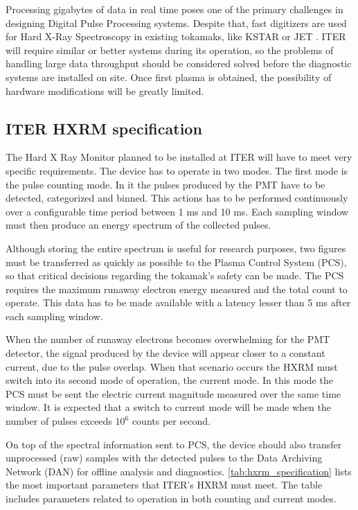 Processing gigabytes of data in real time poses one of 
the primary challenges in designing Digital Pulse Processing systems.
Despite that, fast digitizers are used for Hard X-Ray Spectroscopy
in existing tokamaks, like KSTAR or JET \cite{hxrm_jet, kstar_upgrade}.
ITER will require similar or better systems during its operation,
so the problems of handling large data throughput
should be considered solved before the diagnostic systems
are installed on site. Once first plasma is obtained,
the possibility of hardware modifications will be greatly limited.
 

\subsection{ITER HXRM specification}

The Hard X Ray Monitor planned to be installed at ITER will 
have to meet very specific requirements. The device 
has to operate in two modes. The first mode is the pulse 
counting mode. In it the pulses produced by the PMT have to be
detected, categorized and binned. This actions has to be 
performed continuously over a configurable time period between
1 ms and 10 ms. Each sampling window must then produce an 
energy spectrum of the collected pulses. 
\cite{iter_hxrm_ddd}


Although storing the entire spectrum
is useful for research purposes, two figures must be transferred 
as quickly as possible to the Plasma Control System (PCS), so that
critical decisions regarding the tokamak's safety can be made.
The PCS requires the maximum runaway electron energy measured
and the total count to operate. This data has to be made available
with a latency lesser than 5 ms after each sampling window.
\cite{iter_hxrm_ddd}


When the number of runaway electrons becomes overwhelming for
the PMT detector, the signal produced by the device will 
appear closer to a constant current, due to the pulse overlap.
When that scenario occurs the HXRM must switch into its second 
mode of operation, the current mode. In this mode the PCS 
must be sent the electric current magnitude measured over the 
same time window. It is expected that a switch to current mode
will be made when the number of pulses exceeds $10^6$ counts per second.


On top of the spectral information sent to PCS,
the device should also transfer unprocessed (raw) samples with the detected pulses
to the Data Archiving Network (DAN) for offline analysis and diagnostics.
\autoref{tab:hxrm_specification} lists the most important 
parameters that ITER's HXRM must meet. 
The table includes parameters related to operation 
in both counting and current modes.

